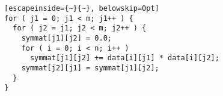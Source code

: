 \begin{lstlisting}[escapeinside={~}{~}, belowskip=0pt]
for ( j1 = 0; j1 < m; j1++ ) {
  for ( j2 = j1; j2 < m; j2++ ) {
    symmat[j1][j2] = 0.0;
    for ( i = 0; i < n; i++ )
      symmat[j1][j2] += data[i][j1] * data[i][j2];
    symmat[j2][j1] = symmat[j1][j2];
  }
}
\end{lstlisting}
